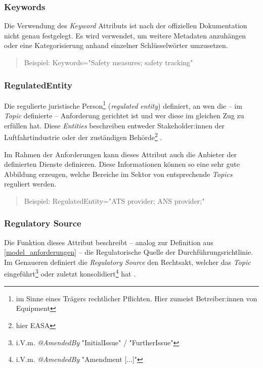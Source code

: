 \subsubsection{Keywords}

    Die Verwendung des \textit{Keyword} Attributs ist nach der offiziellen Dokumentation nicht genau festgelegt.
    Es wird verwendet, um weitere Metadaten anzuhängen oder eine Kategorisierung anhand einzelner Schlüsselwörter umzusetzen.
    \cite[23--26]{easa_xml_doc}
    \begin{quote}
        Beispiel:
        \textsf{Keywords="{}Safety measures; safety tracking"}
    \end{quote}

\subsubsection{RegulatedEntity}

    Die regulierte juristische Person\footnote{im Sinne eines Trägers rechtlicher Pflichten. Hier zumeist Betreiber:innen von \atmans{} Equipment} (\textit{regulated entity}) definiert, an wen die -- im \textit{Topic} definierte -- Anforderung gerichtet ist und wer diese im gleichen Zug zu erfüllen hat.
    Diese \textit{Entities} beschreiben entweder Stakeholder:innen der Luftfahrtindustrie oder der zuständigen Behörde\footnote{hier \ac{EASA}} \cite[26]{easa_xml_doc}.
    
    \medskip
    Im Rahmen der \atmans{} Anforderungen kann dieses Attribut auch die Anbieter der definierten \atmans{} Dienste definieren.
    Diese Informationen können so eine sehr gute Abbildung erzeugen, welche Bereiche im \atmans{} Sektor von entsprechende \textit{Topics} reguliert werden.  
        \begin{quote}
        Beispiel:
        \textsf{RegulatedEntity="{}ATS provider; ANS provider;"}
    \end{quote}
    
    
\subsubsection{Regulatory Source}

    Die Funktion dieses Attribut beschreibt -- analog zur Definition aus \ref{model_anforderungen} -- die Regulatorische Quelle der Durchführungsrichtlinie.
    Im Genaueren definiert die \textit{Regulatory Source} den Rechtsakt, welcher das \textit{Topic} eingeführt\footnote{i.V.m. \textit{@AmendedBy} \textsf{"{}InitialIssue"} / "FurtherIssue"} oder zuletzt konsolidiert\footnote{i.V.m. \textit{@AmendedBy} \textsf{"{}Amendment [...]"}} hat \cite[27]{easa_xml_doc}. 
    
